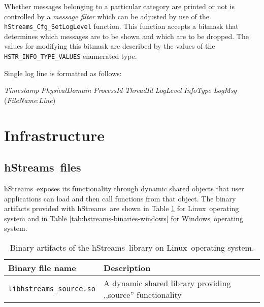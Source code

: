 \documentclass[a4,oneside]{book}
\newcommand{\hstreams}{hStreams}
\newcommand{\windows}{Windows}
\newcommand{\linux}{Linux}
\begin{document}
Whether messages belonging to a particular category are printed or not is controlled by a \emph{message filter} which can be adjusted by use of the \texttt{hStreams\_Cfg\_SetLogLevel} function.
This function accepts a bitmask that determines which messages are to be shown and which are to be dropped.
The values for modifying this bitmask are described by the values of the \texttt{HSTR\_INFO\_TYPE\_VALUES} enumerated type.

Single log line is formatted as follows:

\emph{Timestamp} \emph{PhysicalDomain} \emph{ProcessId} \emph{ThreadId} \emph{LogLevel} \emph{InfoType} \emph{LogMsg} (\emph{FileName}:\emph{Line})

\iffalse
Uncomment if needed

\begin{itemize}
    \item \emph{Timestamp} is number of milliseconds from linux epoch.
    \item \emph{PhysicalDomain} is number of physical domain.
    \item \emph{ProcessId} is id of process which made call to hStreams function.
    \item \emph{ThreadId} is id of thread which made call to hStreams function.
    \item \emph{LogLevel} is one of \texttt{HSTR\_LOG\_LEVEL\_VALUES}
    \item \emph{InfoType} is one of \texttt{HSTR\_INFO\_TYPE\_VALUES}
    \item \emph{LogMsg} is log message.
    \item \emph{FileName} is name of file from which log message comes from.
    \item \emph{Line} is line number in \emph{FileName} from which log message comes from.
\end{itemize}
\fi

\section{Infrastructure}
\subsection{\hstreams\ files}
\hstreams\ exposes its functionality through dynamic shared objects that user applications can load and then call functions from that object. The binary artifacts provided with \hstreams\ are shown in Table \ref{tab:hstreams-binaries-linux} for \linux\ operating system and in Table \ref{tab:hstreams-binaries-windows} for \windows\ operating system.
\begin{table}[h]
\begin{tabularx}{\textwidth}{ l X }\hline
  Binary file name & Description \\ \hline
  \texttt{libhstreams\_source.so} & A dynamic shared library providing ,,source'' functionality \\ \hline
\end{tabularx}
\caption{Binary artifacts of the \hstreams\ library on \linux\ operating system.}
\label{tab:hstreams-binaries-linux}
\end{table}
\end{document}
